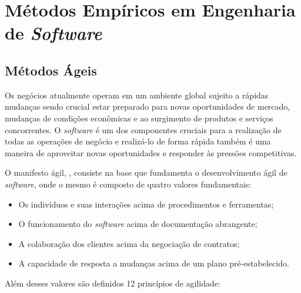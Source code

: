 \chapter{Métodos Empíricos em Engenharia de \textit{Software}}

\section{Métodos Ágeis}
Os negócios atualmente operam em um ambiente global sujeito a rápidas mudanças sendo crucial
estar preparado para novas oportunidades de mercado, mudanças de condições econômicas e ao surgimento
de produtos e serviços concorrentes. O \textit{software} é um dos componentes cruciais para a realização
de todas as operações de negócio e realizá-lo de forma rápida também é uma maneira de aproveitar novas
oportunidades e responder às pressões competitivas. \cite{sommerville_2006}

O manifesto ágil, \cite{beck2001agile}, consiste na base que fundamenta o desenvolvimento ágil de
\textit{software}, onde o mesmo é composto de quatro valores fundamentais:

\begin{itemize}
    \item Os indivíduos e suas interações acima de procedimentos e ferramentas;
    \item O funcionamento do \textit{software} acima de documentação abrangente;
    \item A colaboração dos clientes acima da negociação de contratos;
    \item A capacidade de resposta a mudanças acima de um plano pré-estabelecido.
\end{itemize}

Além desses valores são definidos 12 princípios de agilidade:

